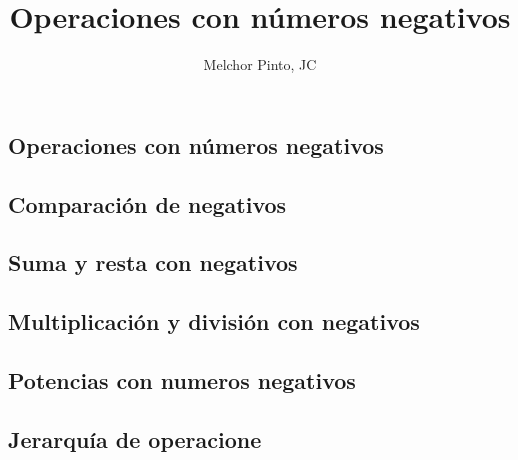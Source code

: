\documentclass{guia}
\title{Operaciones con números negativos}
\author{Melchor Pinto, JC}
\begin{document}
%
\begin{questions}
\section{Operaciones con números negativos}
\subsection{Comparación de negativos}
\questionboxed{}
\subsection{Suma y resta con negativos}
\questionboxed{}
\subsection{Multiplicación y división con negativos}
\questionboxed{}
\subsection{Potencias con numeros negativos}
\questionboxed{}
\subsection{Jerarquía de operacione}
\questionboxed{}

\end{questions}
\end{document}

